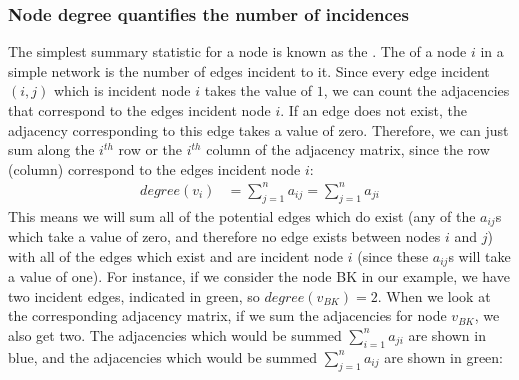 \documentclass[letterpaper,10pt,english]{jupyterBook}
\begin{document}
\subsubsection{Node degree quantifies the number of incidences}
\label{\detokenize{representations/ch4/properties-of-networks:node-degree-quantifies-the-number-of-incidences}}
\sphinxAtStartPar
The simplest summary statistic for a node is known as the . The  of a node \(i\) in a simple network is the number of edges incident to it. Since every edge incident \((i, j)\) which is incident node \(i\) takes the value of \(1\), we can count the adjacencies that correspond to the edges incident node \(i\). If an edge does not exist, the adjacency corresponding to this  edge takes a value of zero. Therefore, we can just sum along the \(i^{th}\) row or the \(i^{th}\) column of the adjacency matrix, since the row (column) correspond to the edges incident node \(i\):
\begin{align*}
    degree(v_i) &= \sum_{j = 1}^n a_{ij} = \sum_{j = 1}^n a_{ji}
\end{align*}
\sphinxAtStartPar
This means we will sum all of the potential edges which do  exist (any of the \(a_{ij}\)s which take a value of zero, and therefore no edge exists between nodes \(i\) and \(j\)) with all of the edges which  exist and are incident node \(i\) (since these \(a_{ij}\)s will take a value of one). For instance, if we consider the node BK in our example, we have two incident edges, indicated in green, so \(degree(v_{BK}) = 2\). When we look at the corresponding adjacency matrix, if we sum the adjacencies for node \(v_{BK}\), we also get two. The adjacencies which would be summed \(\sum_{i = 1}^n a_{ji}\) are shown in blue, and the adjacencies which would be summed \(\sum_{j = 1}^n a_{ij}\) are shown in green:

\noindent{}
\end{document}
